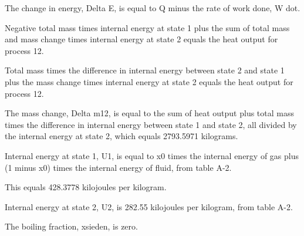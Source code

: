 The change in energy, Delta E, is equal to Q minus the rate of work done, W dot.

Negative total mass times internal energy at state 1 plus the sum of total mass and mass change times internal energy at state 2 equals the heat output for process 12.

Total mass times the difference in internal energy between state 2 and state 1 plus the mass change times internal energy at state 2 equals the heat output for process 12.

The mass change, Delta m12, is equal to the sum of heat output plus total mass times the difference in internal energy between state 1 and state 2, all divided by the internal energy at state 2, which equals 2793.5971 kilograms.

Internal energy at state 1, U1, is equal to x0 times the internal energy of gas plus (1 minus x0) times the internal energy of fluid, from table A-2.

This equals 428.3778 kilojoules per kilogram.

Internal energy at state 2, U2, is 282.55 kilojoules per kilogram, from table A-2.

The boiling fraction, xsieden, is zero.